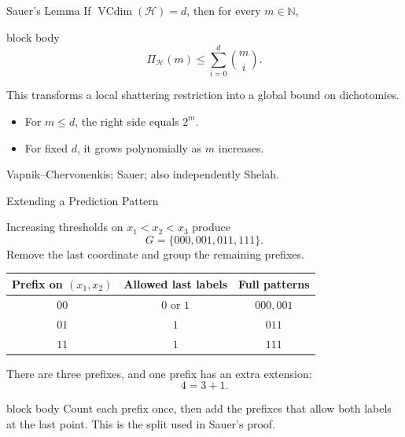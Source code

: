 \documentclass[aspectratio=169,10pt]{beamer}
\newcommand{\Hc}{\mathcal{H}}
\newcommand{\PiH}{\Pi_{\Hc}}
\newcommand{\vcdim}{\operatorname{VCdim}}
\newcommand{\SourceNote}[1]{%
  \vfill
  \begin{flushright}
    {\scriptsize\color{midgray}#1}
  \end{flushright}
}
\newcommand{\KeyBox}[1]{%
  \begin{beamercolorbox}[rounded=true,sep=0.22cm,wd=\linewidth]{block body}
    #1
  \end{beamercolorbox}%
}
\begin{document}
\begin{frame}[t]{Sauer's Lemma}
  \vspace{0.04cm}
  If $\vcdim(\Hc)=d$, then for every $m\in\mathbb{N}$,
  \begin{beamercolorbox}[rounded=true,sep=0.22cm,wd=\linewidth]{block body}
    \[
      \boxed{
      \PiH(m)\le\sum_{i=0}^{d}\binom{m}{i}.}
    \]
  \end{beamercolorbox}
  \vspace{0.15cm}
  This transforms a local shattering restriction into a global bound on dichotomies.
  \vspace{0.10cm}
  \begin{itemize}
    \setlength{\itemsep}{0.10cm}
    \item For $m\le d$, the right side equals $2^m$.
    \item For fixed $d$, it grows polynomially as $m$ increases.
  \end{itemize}
  \SourceNote{Vapnik--Chervonenkis; Sauer; also independently Shelah.}
\end{frame}

\begin{frame}[t]{Extending a Prediction Pattern}
  \vspace{0.04cm}
  \small

  Increasing thresholds on $x_1<x_2<x_3$ produce
  \[
    G=\{000,001,011,111\}.
  \]
  Remove the last coordinate and group the remaining prefixes.
  \begin{center}
  \renewcommand{\arraystretch}{1.15}
  \begin{tabular}{ccc}
    \toprule
    Prefix on $(x_1,x_2)$ & Allowed last labels & Full patterns\\
    \midrule
    $00$ & $0$ or $1$ & $000,001$\\
    $01$ & $1$ & $011$\\
    $11$ & $1$ & $111$\\
    \bottomrule
  \end{tabular}
  \end{center}
  There are three prefixes, and one prefix has an extra extension:
  \[
    4=3+1.
  \]
  \KeyBox{Count each prefix once, then add the prefixes that allow both
  labels at the last point. This is the split used in Sauer's proof.}

\end{frame}
\end{document}
